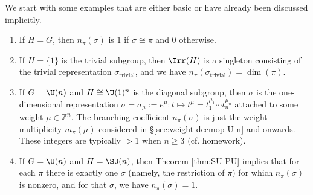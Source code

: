 \documentclass[reqno]{amsart} 
\begin{document}
We start with some examples that are either basic or have already been discussed implicitly.
\begin{enumerate}
\item If $H = G$, then $n_\pi(\sigma)$ is $1$ if $\sigma \cong \pi$ and $0$ otherwise.
\item If $H = \{1\}$ is the trivial subgroup, then $\Irr(H)$ is a singleton consisting of the trivial representation $\sigma_{\text{trivial}}$, and we have $n_\pi(\sigma_{\text{trivial}}) = \dim(\pi)$.
\item If $G = \U(n)$ and $H \cong \U(1)^n$ is the diagonal subgroup, then $\sigma$ is the one-dimensional representation $\sigma = \sigma_\mu := e^{\mu} : t \mapsto t^{\mu} = t_1^{\mu_1} \dotsb t_n^{\mu_n}$ attached to some weight $\mu \in \mathbb{Z}^n$.  The branching coefficient $n_\pi(\sigma)$ is just the weight multiplicity $m_\pi(\mu)$ considered in \S\ref{sec:weight-decmop-U-n} and onwards.  These integers are typically $> 1$ when $n \geq 3$ (cf. homework).
\item If $G = \U(n)$ and $H = \SU(n)$, then Theorem \ref{thm:SU-PU} implies that for each $\pi$ there is exactly one $\sigma$ (namely, the restriction of $\pi$) for which $n_{\pi}(\sigma)$ is nonzero, and for that $\sigma$, we have $n_{\pi}(\sigma) = 1$.
\end{enumerate}
\end{document}
